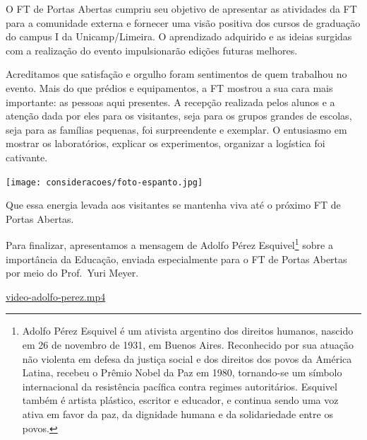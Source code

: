 \documentclass[
  letterpaper,
  DIV=11,
  numbers=noendperiod]{scrreprt}
\begin{document}
O FT de Portas Abertas cumpriu seu objetivo de apresentar as atividades
da FT para a comunidade externa e fornecer uma visão positiva dos cursos
de graduação do campus I da Unicamp/Limeira. O aprendizado adquirido e
as ideias surgidas com a realização do evento impulsionarão edições
futuras melhores.

Acreditamos que satisfação e orgulho foram sentimentos de quem trabalhou
no evento. Mais do que prédios e equipamentos, a FT mostrou a sua cara
mais importante: as pessoas aqui presentes. A recepção realizada pelos
alunos e a atenção dada por eles para os visitantes, seja para os grupos
grandes de escolas, seja para as famílias pequenas, foi surpreendente e
exemplar. O entusiasmo em mostrar os laboratórios, explicar os
experimentos, organizar a logística foi cativante.

\texttt{[image: consideracoes/foto-espanto.jpg]}

Que essa energia levada aos visitantes se mantenha viva até o próximo FT
de Portas Abertas.

Para finalizar, apresentamos a mensagem de Adolfo Pérez
Esquivel\footnote{Adolfo Pérez Esquivel é um ativista argentino dos
  direitos humanos, nascido em 26 de novembro de 1931, em Buenos Aires.
  Reconhecido por sua atuação não violenta em defesa da justiça social e
  dos direitos dos povos da América Latina, recebeu o Prêmio Nobel da
  Paz em 1980, tornando-se um símbolo internacional da resistência
  pacífica contra regimes autoritários. Esquivel também é artista
  plástico, escritor e educador, e continua sendo uma voz ativa em favor
  da paz, da dignidade humana e da solidariedade entre os povos.} sobre
a importância da Educação, enviada especialmente para o FT de Portas
Abertas por meio do Prof.~Yuri Meyer.

\url{video-adolfo-perez.mp4}
\end{document}
